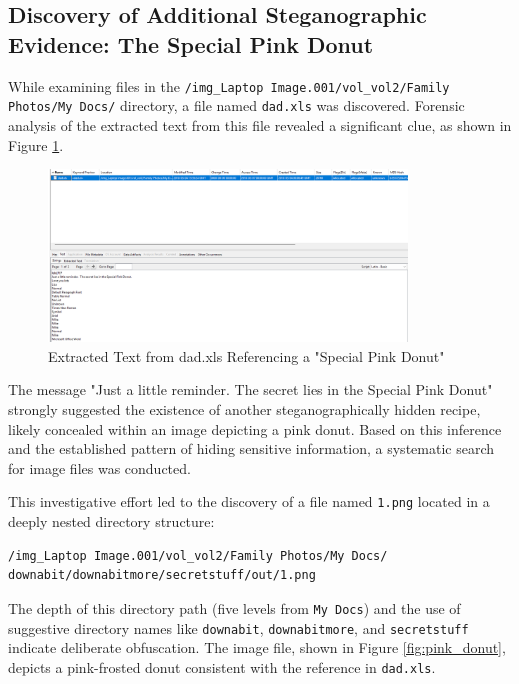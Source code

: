 \subsection{Discovery of Additional Steganographic Evidence: The Special Pink Donut}
While examining files in the \texttt{/img\_Laptop Image.001/vol\_vol2/Family Photos/My Docs/} directory, a file named \texttt{dad.xls} was discovered. Forensic analysis of the extracted text from this file revealed a significant clue, as shown in Figure \ref{fig:dad_xls}.

\begin{figure}[htbp]
    \centering
    \includegraphics[width=0.85\textwidth]{images/Artifact and Evidence Recovery/dad_xls.png}
    \caption{Extracted Text from dad.xls Referencing a "Special Pink Donut"}
    \label{fig:dad_xls}
\end{figure}

The message "Just a little reminder. The secret lies in the Special Pink Donut" strongly suggested the existence of another steganographically hidden recipe, likely concealed within an image depicting a pink donut. Based on this inference and the established pattern of hiding sensitive information, a systematic search for image files was conducted.

This investigative effort led to the discovery of a file named \texttt{1.png} located in a deeply nested directory structure:
\begin{verbatim}
/img_Laptop Image.001/vol_vol2/Family Photos/My Docs/
downabit/downabitmore/secretstuff/out/1.png
\end{verbatim}

The depth of this directory path (five levels from \texttt{My Docs}) and the use of suggestive directory names like \texttt{downabit}, \texttt{downabitmore}, and \texttt{secretstuff} indicate deliberate obfuscation. The image file, shown in Figure \ref{fig:pink_donut}, depicts a pink-frosted donut consistent with the reference in \texttt{dad.xls}.

